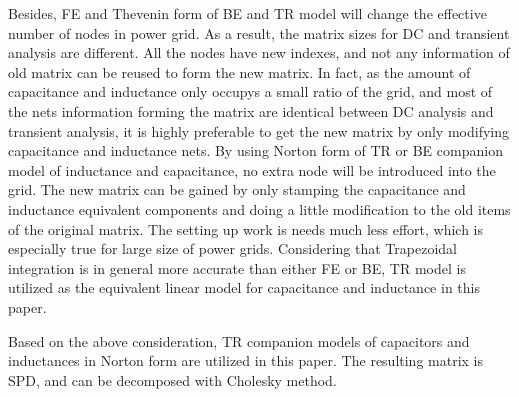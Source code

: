 Besides, FE and Thevenin form of BE and TR model will change the effective number of nodes in power grid. As a result, the matrix sizes for DC and transient analysis are different. All the nodes have new indexes, and not any information of old matrix can be reused to form the new matrix. In fact, as the amount of capacitance and inductance only occupys a small ratio of the grid, and most of the nets
information forming the matrix are identical between DC analysis and transient analysis, it is highly preferable to get the new matrix by
only modifying capacitance and inductance nets. By using Norton form of TR or BE companion model of inductance and capacitance, no extra 
node will be introduced into the grid. The new matrix can be gained by only stamping
the capacitance and inductance equivalent components and doing a little modification to the old items of the original matrix. The setting up work is needs much less effort, which is especially true for large size of power grids. Considering that 
Trapezoidal integration is in general more accurate than either FE or BE\cite{ECE552}, TR model is utilized as the equivalent linear model for capacitance and inductance in this paper.

Based on the above consideration, TR companion models of capacitors and inductances in Norton form are utilized in this paper. The 
resulting matrix is SPD, and can be decomposed with Cholesky method.